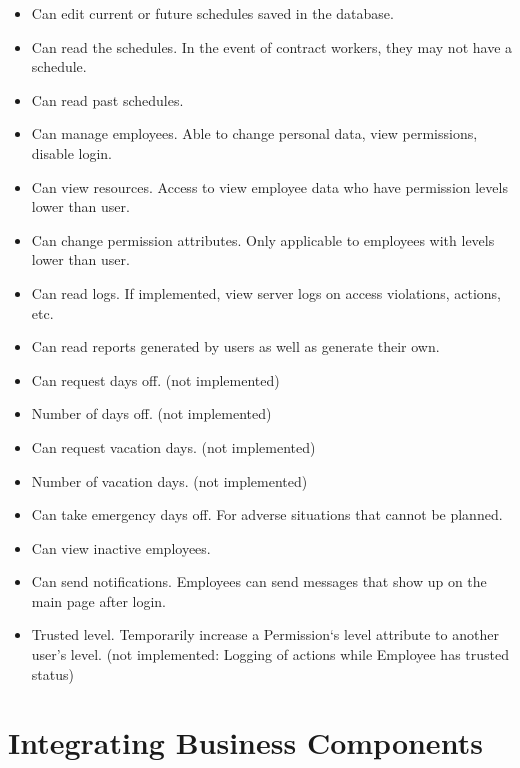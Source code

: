 \documentclass[a4paper,10pt]{report}
\begin{document}
\begin{itemize}
 \item Can edit current or future schedules saved in the database.
 \item Can read the schedules. In the event of contract workers, they may not have a schedule.
 \item Can read past schedules. 
 \item Can manage employees. Able to change personal data, view permissions, disable login.
 \item Can view resources. Access to view employee data who have permission levels lower than user.
 \item Can change permission attributes. Only applicable to employees with levels lower than user.
 \item Can read logs. If implemented, view server logs on access violations, actions, etc.
 \item Can read reports generated by users as well as generate their own.
 \item Can request days off. (not implemented)
 \item Number of days off. (not implemented)
 \item Can request vacation days. (not implemented)
 \item Number of vacation days. (not implemented)
 \item Can take emergency days off. For adverse situations that cannot be planned.
 \item Can view inactive employees. 
 \item Can send notifications. Employees can send messages that show up on the main page after login.
 \item Trusted level. Temporarily increase a Permission`s level attribute to another user's level. \newline
 		(not implemented: Logging of actions while Employee has trusted status)
\end{itemize}



\section{Integrating Business Components}
\end{document}
